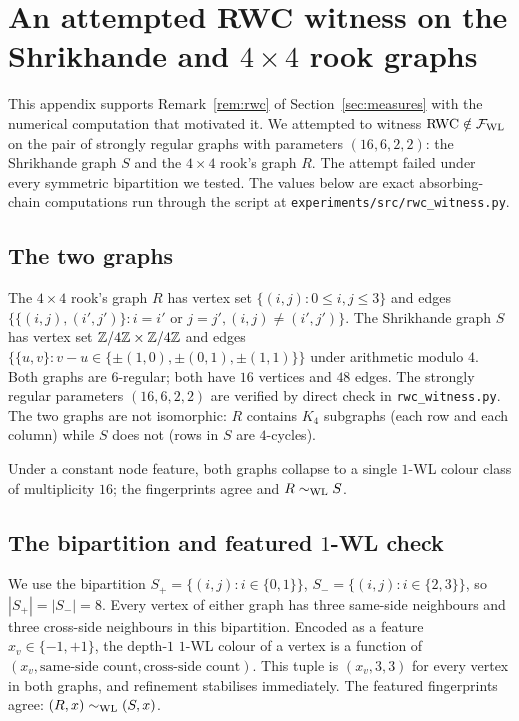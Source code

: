 
\section{An attempted RWC witness on the Shrikhande and $4 \times 4$
rook graphs}\label{app:rwc-witness}

This appendix supports Remark~\ref{rem:rwc} of Section~\ref{sec:measures} with
the numerical computation that motivated it. We attempted to
witness $\mathrm{RWC} \notin \mathcal{F}_{\mathrm{WL}}$ on the pair of
strongly regular graphs with parameters $(16, 6, 2, 2)$: the
Shrikhande graph $S$ and the $4 \times 4$ rook's graph $R$. The
attempt failed under every symmetric bipartition we tested. The
values below are exact absorbing-chain computations run through
the script at \texttt{experiments/src/rwc\_witness.py}.

\subsection{The two graphs}

The $4 \times 4$ rook's graph $R$ has vertex set $\{(i, j) : 0 \le
i, j \le 3\}$ and edges $\{\{(i, j), (i', j')\} : i = i' \text{ or }
j = j', (i, j) \neq (i', j')\}$. The Shrikhande graph $S$ has
vertex set $\mathbb{Z}/4\mathbb{Z} \times \mathbb{Z}/4\mathbb{Z}$ and edges $\{\{u, v\} : v - u \in
\{\pm (1, 0), \pm (0, 1), \pm (1, 1)\}\}$ under arithmetic modulo
$4$. Both graphs are $6$-regular; both have $16$ vertices and $48$
edges. The strongly regular parameters $(16, 6, 2, 2)$ are verified
by direct check in \texttt{rwc\_witness.py}. The two graphs are not
isomorphic: $R$ contains $K_4$ subgraphs (each row and each column)
while $S$ does not (rows in $S$ are $4$-cycles).

Under a constant node feature, both graphs collapse to a single
$1$-WL colour class of multiplicity $16$; the fingerprints agree
and $R \sim_{\mathrm{WL}} S$.

\subsection{The bipartition and featured $1$-WL check}

We use the bipartition $S_+ = \{(i, j) : i \in \{0, 1\}\}$, $S_- =
\{(i, j) : i \in \{2, 3\}\}$, so $|S_+| = |S_-| = 8$. Every vertex
of either graph has three same-side neighbours and three cross-side
neighbours in this bipartition. Encoded as a feature $x_v \in \{-1,
+1\}$, the depth-$1$ $1$-WL colour of a vertex is a function of
$(x_v, \text{same-side count}, \text{cross-side count})$. This
tuple is $(x_v, 3, 3)$ for every vertex in both graphs, and
refinement stabilises immediately. The featured fingerprints agree:
$(R, x) \sim_{\mathrm{WL}} (S, x)$.


